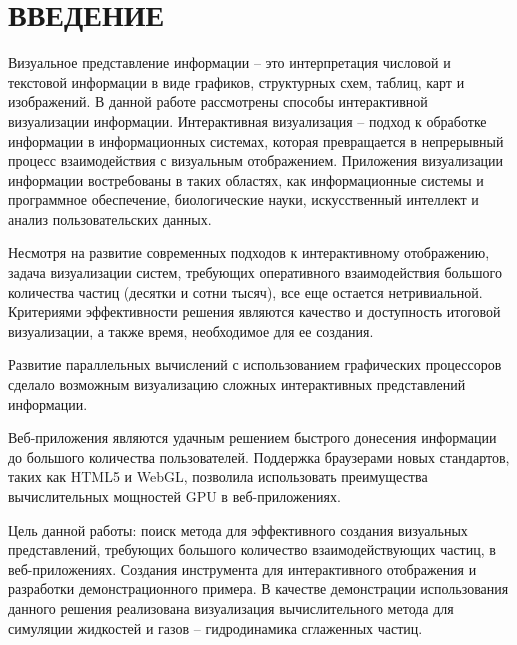 \newpage
\section*{ВВЕДЕНИЕ}

Визуальное представление информации -- это интерпретация числовой и текстовой
информации в виде графиков, структурных схем, таблиц, карт и изображений.
В данной работе рассмотрены способы интерактивной визуализации информации.
Интерактивная визуализация -- подход к обработке информации в информационных 
системах, которая превращается в непрерывный процесс взаимодействия с 
визуальным отображением. Приложения визуализации информации востребованы в таких 
областях, как информационные системы и программное обеспечение, биологические 
науки, искусственный интеллект и анализ пользовательских данных.

Несмотря на развитие современных подходов к интерактивному отображению, задача
визуализации систем, требующих оперативного взаимодействия большого количества
частиц (десятки и сотни тысяч), все еще остается нетривиальной. Критериями 
эффективности решения являются качество и доступность итоговой визуализации, 
а также время, необходимое для ее создания.

Развитие параллельных вычислений с использованием графических процессоров сделало 
возможным визуализацию сложных интерактивных представлений информации. 

Веб-приложения являются удачным решением быстрого донесения информации до большого
количества пользователей. Поддержка браузерами новых стандартов, таких как HTML5 и WebGL,  
позволила использовать преимущества вычислительных мощностей GPU в веб-приложениях.

Цель данной работы: поиск метода для эффективного создания визуальных представлений,
требующих большого количество взаимодействующих частиц,
в веб-приложениях. Создания инструмента для интерактивного отображения и разработки
демонстрационного примера. В качестве демонстрации использования данного решения реализована 
визуализация вычислительного метода для симуляции жидкостей и газов -- гидродинамика 
сглаженных частиц.


